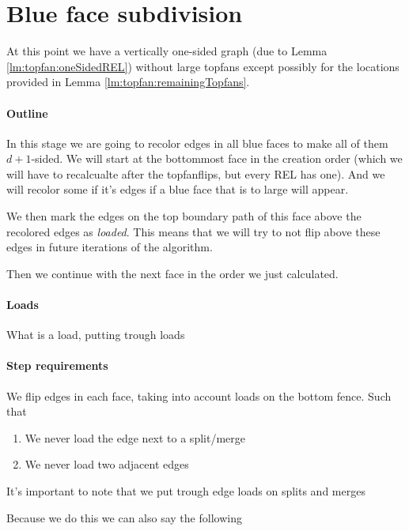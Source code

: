 
\section{Blue face subdivision}
\label{s:subdiv}


At this point we have a vertically one-sided graph (due to Lemma \ref{lm:topfan:oneSidedREL}) without large topfans except possibly for the locations provided in Lemma \ref{lm:topfan:remainingTopfans}.

\paragraph{Outline}
In this stage we are going to recolor edges in all blue faces to make all of them $d+1$-sided. We will start at the bottommost face in the creation order (which we will have to recalcualte after the topfanflips, but every REL has one). And we will recolor some if it's edges if a blue face that is to large will appear. 

We then mark the edges on the top boundary path of this face above the recolored edges as \emph{loaded}. This means that we will try to not flip above these edges in future iterations of the algorithm.

Then we continue with the next face in the order we just calculated.


\paragraph{Loads}
What is a load, putting trough loads


\paragraph{Step requirements}
We flip edges in each face, taking into account loads on the bottom fence. Such that

\begin{enumerate}
  \item We never load the edge next to a split/merge
  \item We never load two adjacent edges
\end{enumerate}

It's important to note that we put trough edge loads on splits and merges

Because we do this we can also say the following

